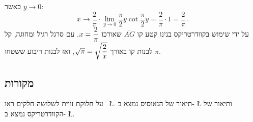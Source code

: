 כאשר
$y\rightarrow 0$:
\[
x \rightarrow \frac{2}{\pi}\cdot \lim_{y\rightarrow 0}\frac{\pi}{2}y\cot \frac{\pi}{2}y = \frac{2}{\pi}\cdot 1 = \frac{2}{\pi}\,.
\]
על ידי שימוש בקוודרטריקס בנינו קטע קו
$\overline{AG}$
שאורכו
$x=\displaystyle\frac{2}{\pi}$.
עם סרגל רגיל ומחוגה, קל לבנות קו באורך
$\sqrt{\pi}=\sqrt{\displaystyle\frac{2}{x}}$,
ואז לבנות ריבוע ששטחו
$\pi$.



\subsection*{מקורות}


על חלוקת זווית לשלושה חלקים ראו~%
\L{\cite{wiki:tri}}.
תיאור של הנאוסיס נמצא ב-%
\L{\cite{wiki:neu}}
ותיאור של הקוודרטריקס נמצא ב-%
\L{\cite{wiki:quad}}.
